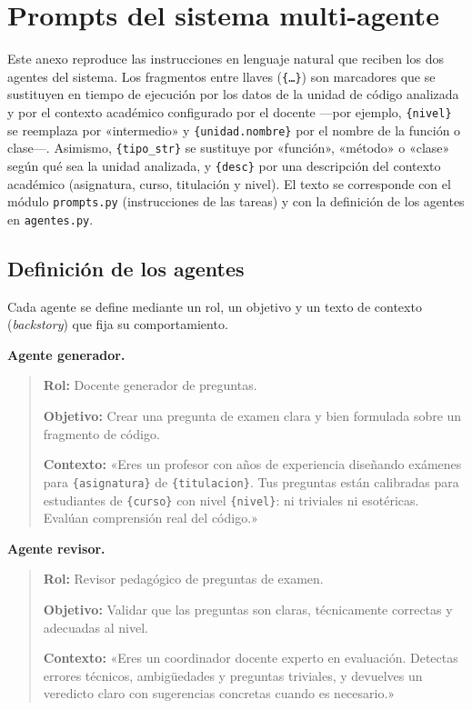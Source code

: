 \chapter{Prompts del sistema multi-agente}
\label{anexo:prompts}

Este anexo reproduce las instrucciones en lenguaje natural que reciben los dos
agentes del sistema. Los fragmentos entre llaves (\texttt{\{\ldots\}}) son
marcadores que se sustituyen en tiempo de ejecución por los datos de la unidad
de código analizada y por el contexto académico configurado por el docente
---por ejemplo, \texttt{\{nivel\}} se reemplaza por «intermedio» y
\texttt{\{unidad.nombre\}} por el nombre de la función o clase---. Asimismo,
\texttt{\{tipo\_str\}} se sustituye por «función», «método» o «clase» según qué
sea la unidad analizada, y \texttt{\{desc\}} por una descripción del contexto
académico (asignatura, curso, titulación y nivel). El texto se
corresponde con el módulo \texttt{prompts.py} (instrucciones de las tareas) y
con la definición de los agentes en \texttt{agentes.py}.


\section{Definición de los agentes}
\label{sec:anexo-agentes}

Cada agente se define mediante un rol, un objetivo y un texto de contexto
(\emph{backstory}) que fija su comportamiento.

\textbf{Agente generador.}

\begin{quote}\small
\textbf{Rol:} Docente generador de preguntas.

\textbf{Objetivo:} Crear una pregunta de examen clara y bien formulada sobre un
fragmento de código.

\textbf{Contexto:} «Eres un profesor con años de experiencia diseñando exámenes
para \texttt{\{asignatura\}} de \texttt{\{titulacion\}}. Tus preguntas están
calibradas para estudiantes de \texttt{\{curso\}} con nivel \texttt{\{nivel\}}:
ni triviales ni esotéricas. Evalúan comprensión real del código.»
\end{quote}

\textbf{Agente revisor.}

\begin{quote}\small
\textbf{Rol:} Revisor pedagógico de preguntas de examen.

\textbf{Objetivo:} Validar que las preguntas son claras, técnicamente correctas
y adecuadas al nivel.

\textbf{Contexto:} «Eres un coordinador docente experto en evaluación. Detectas
errores técnicos, ambigüedades y preguntas triviales, y devuelves un veredicto
claro con sugerencias concretas cuando es necesario.»
\end{quote}


